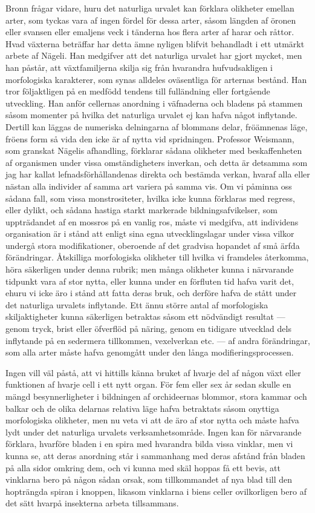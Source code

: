 Bronn frågar vidare, huru det naturliga urvalet kan förklara olikheter emellan arter, som tyckas vara af ingen fördel för dessa arter, såsom längden af öronen eller svansen eller emaljens veck i tänderna hos flera arter af harar och råttor. Hvad växterna beträffar har detta ämne nyligen blifvit behandladt i ett utmärkt arbete af Nägeli. Han medgifver att det naturliga urvalet har gjort mycket, men han påstår, att växtfamiljerna skilja sig från hvarandra hufvudsakligen i morfologiska karakterer, som synas alldeles oväsentliga för arternas bestånd. Han tror följaktligen på en medfödd tendens till fulländning eller fortgående utveckling. Han anför cellernas anordning i väfnaderna och bladens på stammen såsom momenter på hvilka det naturliga urvalet ej kan hafva något inflytande. Dertill kan läggas de numeriska delningarna af blommans delar, fröämnenas läge, fröens form så vida den icke är af nytta vid spridningen. Professor Weismann, som granskat Nägelis afhandling, förklarar sådana olikheter med beskaffenheten af organismen under vissa omständigheters inverkan, och detta är detsamma som jag har kallat lefnadsförhållandenas direkta och bestämda verkan, hvaraf alla eller nästan alla individer af samma art variera på samma vis. Om vi påminna oss sådana fall, som vissa monstrositeter, hvilka icke kunna förklaras med regress, eller dylikt, och sådana hastiga starkt markerade bildningsafvikelser, som uppträdandet af en mossros på en vanlig ros, måste vi medgifva, att individens organisation är i stånd att enligt sina egna utvecklingslagar under vissa vilkor undergå stora modifikationer, oberoende af det gradvisa hopandet af små ärfda förändringar. Åtskilliga morfologiska olikheter till hvilka vi framdeles återkomma, höra säkerligen under denna rubrik; men många olikheter kunna i närvarande tidpunkt vara af stor nytta, eller kunna under en förfluten tid hafva varit det, ehuru vi icke äro i stånd att fatta deras bruk, och derföre hafva de stått under det naturliga urvalets inflytande. Ett ännu större antal af morfologiska skiljaktigheter kunna säkerligen betraktas såsom ett nödvändigt resultat — genom tryck, brist eller öfverflöd på näring, genom en tidigare utvecklad dels inflytande på en sedermera tillkommen, vexelverkan etc. — af andra förändringar, som alla arter måste hafva genomgått under den långa modifieringsprocessen.

Ingen vill väl påstå, att vi hittills känna bruket af hvarje del af någon växt eller funktionen af hvarje cell i ett nytt organ. För fem eller sex år sedan skulle en mängd besynnerligheter i bildningen af orchideernas blommor, stora kammar och balkar och de olika delarnas relativa läge hafva betraktats såsom onyttiga morfologiska olikheter, men nu veta vi att de äro af stor nytta och måste hafva lydt under det naturliga urvalets verksamhetsområde. Ingen kan för närvarande förklara, hvarföre bladen i en spira med hvarandra bilda vissa vinklar, men vi kunna se, att deras anordning står i sammanhang med deras afstånd från bladen på alla sidor omkring dem, och vi kunna med skäl hoppas få ett bevis, att vinklarna bero på någon sådan orsak, som tillkommandet af nya blad till den hopträngda spiran i knoppen, likasom vinklarna i biens celler ovilkorligen bero af det sätt hvarpå insekterna arbeta tillsammans.

